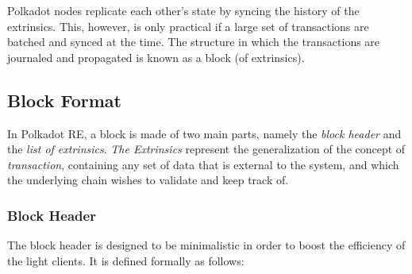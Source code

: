 \documentclass{book}
\newcommand{\tmem}[1]{{\em #1\/}}
\newcommand{\tmtextit}[1]{{\itshape{#1}}}
\providecommand{\tmem}[1]{\tmtextit{#1}}
\providecommand{\tmtextit}[1]{\tmtextit{#1}}
\begin{document}
Polkadot nodes replicate each other's state by syncing the history of the
extrinsics. This, however, is only practical if a large set of transactions
are batched and synced at the time. The structure in which the transactions
are journaled and propagated is known as a block (of extrinsics).

\subsection{Block Format}\label{sect-block-format}

In Polkadot RE, a block is made of two main parts, namely the \tmtextit{block
header} and the \tmtextit{list of extrinsics}. {\tmem{The Extrinsics}}
represent the generalization of the concept of {\tmem{transaction}},
containing any set of data that is external to the system, and which the
underlying chain wishes to validate and keep track of.

\subsubsection{Block Header}\label{block}

The block header is designed to be minimalistic in order to boost the
efficiency of the light clients. It is defined formally as follows:
\end{document}
